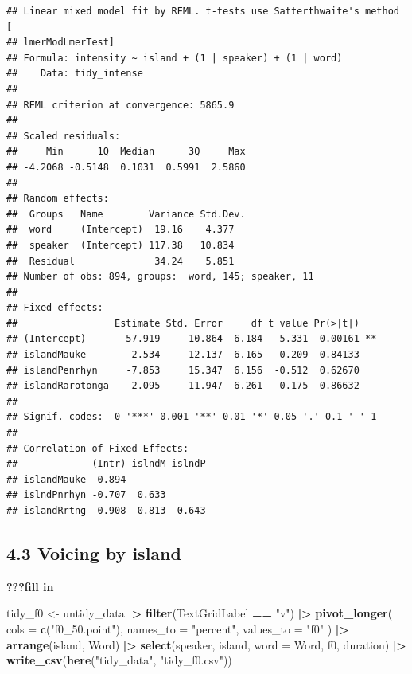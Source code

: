 \documentclass[
  ,man,floatsintext]{apa6}
\newenvironment{Shaded}{\begin{snugshade}}{\end{snugshade}}
\newcommand{\AttributeTok}[1]{\textcolor[rgb]{0.13,0.29,0.53}{#1}}
\newcommand{\FunctionTok}[1]{\textcolor[rgb]{0.13,0.29,0.53}{\textbf{#1}}}
\newcommand{\NormalTok}[1]{#1}
\newcommand{\OtherTok}[1]{\textcolor[rgb]{0.56,0.35,0.01}{#1}}
\newcommand{\SpecialCharTok}[1]{\textcolor[rgb]{0.81,0.36,0.00}{\textbf{#1}}}
\newcommand{\StringTok}[1]{\textcolor[rgb]{0.31,0.60,0.02}{#1}}
\begin{document}
\begin{verbatim}
## Linear mixed model fit by REML. t-tests use Satterthwaite's method [
## lmerModLmerTest]
## Formula: intensity ~ island + (1 | speaker) + (1 | word)
##    Data: tidy_intense
## 
## REML criterion at convergence: 5865.9
## 
## Scaled residuals: 
##     Min      1Q  Median      3Q     Max 
## -4.2068 -0.5148  0.1031  0.5991  2.5860 
## 
## Random effects:
##  Groups   Name        Variance Std.Dev.
##  word     (Intercept)  19.16    4.377  
##  speaker  (Intercept) 117.38   10.834  
##  Residual              34.24    5.851  
## Number of obs: 894, groups:  word, 145; speaker, 11
## 
## Fixed effects:
##                 Estimate Std. Error     df t value Pr(>|t|)   
## (Intercept)       57.919     10.864  6.184   5.331  0.00161 **
## islandMauke        2.534     12.137  6.165   0.209  0.84133   
## islandPenrhyn     -7.853     15.347  6.156  -0.512  0.62670   
## islandRarotonga    2.095     11.947  6.261   0.175  0.86632   
## ---
## Signif. codes:  0 '***' 0.001 '**' 0.01 '*' 0.05 '.' 0.1 ' ' 1
## 
## Correlation of Fixed Effects:
##             (Intr) islndM islndP
## islandMauke -0.894              
## islndPnrhyn -0.707  0.633       
## islandRrtng -0.908  0.813  0.643
\end{verbatim}

\subsection{4.3 Voicing by island}\label{voicing-by-island}

\textbf{???fill in}

\begin{Shaded}
\begin{Highlighting}[]
\NormalTok{tidy\_f0 }\OtherTok{\textless{}{-}}\NormalTok{ untidy\_data }\SpecialCharTok{|\textgreater{}}
  \FunctionTok{filter}\NormalTok{(TextGridLabel }\SpecialCharTok{==} \StringTok{"v"}\NormalTok{) }\SpecialCharTok{|\textgreater{}}
  \FunctionTok{pivot\_longer}\NormalTok{(}
    \AttributeTok{cols =} \FunctionTok{c}\NormalTok{(}\StringTok{"f0\_50.point"}\NormalTok{), }
    \AttributeTok{names\_to =} \StringTok{"percent"}\NormalTok{,}
    \AttributeTok{values\_to =} \StringTok{"f0"}
\NormalTok{  ) }\SpecialCharTok{|\textgreater{}}
  \FunctionTok{arrange}\NormalTok{(island, Word) }\SpecialCharTok{|\textgreater{}}  
  \FunctionTok{select}\NormalTok{(speaker, island, }\AttributeTok{word =}\NormalTok{ Word, f0, duration) }\SpecialCharTok{|\textgreater{}}
  \FunctionTok{write\_csv}\NormalTok{(}\FunctionTok{here}\NormalTok{(}\StringTok{"tidy\_data"}\NormalTok{, }\StringTok{"tidy\_f0.csv"}\NormalTok{))}
\end{Highlighting}
\end{Shaded}
\end{document}
